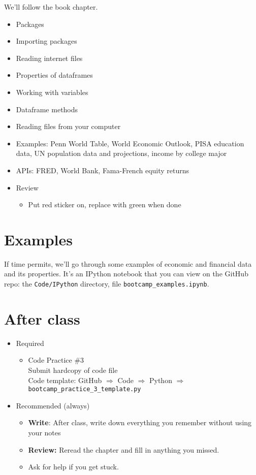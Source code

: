 \documentclass[11pt]{article}
\begin{document}
We'll follow the book chapter.
\begin{itemize}
\item Packages
\item Importing packages
\item Reading internet files
\item Properties of dataframes
\item Working with variables
\item Dataframe methods
\item Reading files from your computer
\item Examples:  Penn World Table, World Economic Outlook, PISA education data, UN population data and
projections, income by college major
\item APIs:  FRED, World Bank, Fama-French equity returns
\item Review
\begin{itemize}
\item Put red sticker on, replace with green when done
\end{itemize}
\end{itemize}


\section*{Examples}

If time permits, we'll go through some examples of economic and financial data
and its properties.  It's an IPython notebook that you can view on the GitHub repo:
the \verb|Code/IPython| directory,
file \verb|bootcamp_examples.ipynb|.


\section*{After class}

\begin{itemize}
\item Required
\begin{itemize}
\item Code Practice \#3 \\
Submit hardcopy of code file \\
Code template:  GitHub $\Rightarrow$ Code $\Rightarrow$ Python
$\Rightarrow$ \verb|bootcamp_practice_3_template.py|

\end{itemize}
\item Recommended (always)
\begin{itemize}
\item {\bf Write}:  After class, write down everything you remember without using your notes
\item {\bf Review:} Reread the chapter and fill in anything you missed.
\item Ask for help if you get stuck.
\end{itemize}
\end{itemize}


\end{document}
